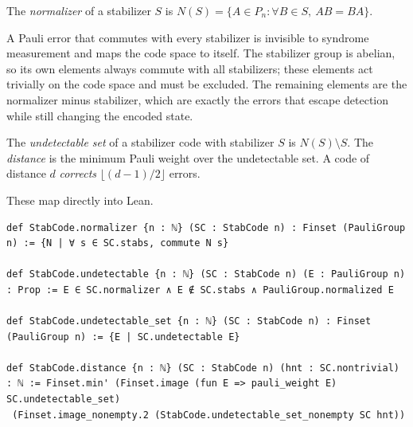 \begin{definition}
    The \emph{normalizer} of a stabilizer $S$ is $N(S) = \{A \in P_n : \forall B
    \in S,\ AB = BA\}$.
\end{definition}
A Pauli error that commutes with every stabilizer is invisible to syndrome
measurement and maps the code space to itself. The stabilizer group is abelian,
so its own elements always commute with all stabilizers; these elements act
trivially on the code space and must be excluded. The remaining elements are the
normalizer minus stabilizer, which are exactly the errors that escape detection
while still changing the encoded state.
\begin{definition}
    The \emph{undetectable set} of a stabilizer code with stabilizer $S$ is
    $N(S) \setminus S$. The \emph{distance} is the minimum Pauli weight over the
    undetectable set. A code of distance $d$ \emph{corrects} $\lfloor (d-1)/2
    \rfloor$ errors.
\end{definition}
These map directly into Lean.

\begin{lstlisting}
def StabCode.normalizer {n : ℕ} (SC : StabCode n) : Finset (PauliGroup n) := {N | ∀ s ∈ SC.stabs, commute N s}

def StabCode.undetectable {n : ℕ} (SC : StabCode n) (E : PauliGroup n) : Prop := E ∈ SC.normalizer ∧ E ∉ SC.stabs ∧ PauliGroup.normalized E

def StabCode.undetectable_set {n : ℕ} (SC : StabCode n) : Finset (PauliGroup n) := {E | SC.undetectable E}

def StabCode.distance {n : ℕ} (SC : StabCode n) (hnt : SC.nontrivial) : ℕ := Finset.min' (Finset.image (fun E => pauli_weight E) SC.undetectable_set)
 (Finset.image_nonempty.2 (StabCode.undetectable_set_nonempty SC hnt))
\end{lstlisting}

%
%

